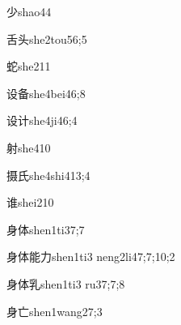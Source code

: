 \begin{verbete}{少}{shao4}{4}
\end{verbete}

\begin{verbete}{舌头}{she2tou5}{6;5}
\end{verbete}

\begin{verbete}{蛇}{she2}{11}
\end{verbete}

\begin{verbete}{设备}{she4bei4}{6;8}
\end{verbete}

\begin{verbete}{设计}{she4ji4}{6;4}
\end{verbete}

\begin{verbete}{射}{she4}{10}
\end{verbete}

\begin{verbete}{摄氏}{she4shi4}{13;4}
\end{verbete}

\begin{verbete}{谁}{shei2}{10}
\end{verbete}

\begin{verbete}{身体}{shen1ti3}{7;7}
\end{verbete}

\begin{verbete}{身体能力}{shen1ti3 neng2li4}{7;7;10;2}
\end{verbete}

\begin{verbete}{身体乳}{shen1ti3 ru3}{7;7;8}
\end{verbete}

\begin{verbete}{身亡}{shen1wang2}{7;3}
\end{verbete}

